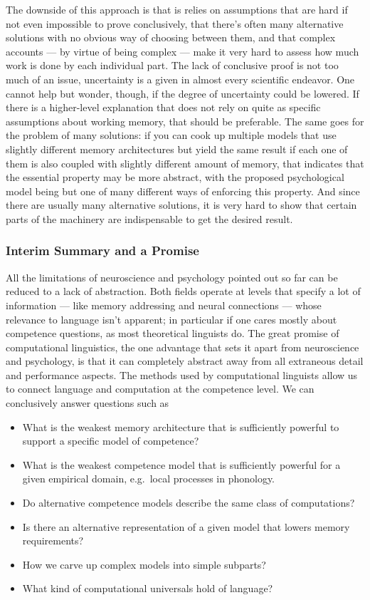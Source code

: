 The downside of this approach is that is relies on assumptions that are hard if not even impossible to prove conclusively, that there's often many alternative solutions with no obvious way of choosing between them, and that complex accounts --- by virtue of being complex --- make it very hard to assess how much work is done by each individual part.
The lack of conclusive proof is not too much of an issue, uncertainty is a given in almost every scientific endeavor.
One cannot help but wonder, though, if the degree of uncertainty could be lowered.
If there is a higher-level explanation that does not rely on quite as specific assumptions about working memory, that should be preferable.
The same goes for the problem of many solutions: if you can cook up multiple models that use slightly different memory architectures but yield the same result if each one of them is also coupled with slightly different amount of memory, that indicates that the essential property may be more abstract, with the proposed psychological model being but one of many different ways of enforcing this property.
And since there are usually many alternative solutions, it is very hard to show that certain parts of the machinery are indispensable to get the desired result.

\subsubsection{Interim Summary and a Promise}

All the limitations of neuroscience and psychology pointed out so far can be reduced to a lack of abstraction.
Both fields operate at levels that specify a lot of information --- like memory addressing and neural connections --- whose relevance to language isn't apparent; in particular if one cares mostly about competence questions, as most theoretical linguists do.
The great promise of computational linguistics, the one advantage that sets it apart from neuroscience and psychology, is that it can completely abstract away from all extraneous detail and performance aspects.
The methods used by computational linguists allow us to connect language and computation at the competence level. 
We can conclusively answer questions such as
%
\begin{itemize}
    \item What is the weakest memory architecture that is sufficiently powerful to support a specific model of competence?
    \item What is the weakest competence model that is sufficiently powerful for a given empirical domain, e.g.\ local processes in phonology.
    \item Do alternative competence models describe the same class of computations?
    \item Is there an alternative representation of a given model that lowers memory requirements?
    \item How we carve up complex models into simple subparts? 
    \item What kind of computational universals hold of language?
\end{itemize}


